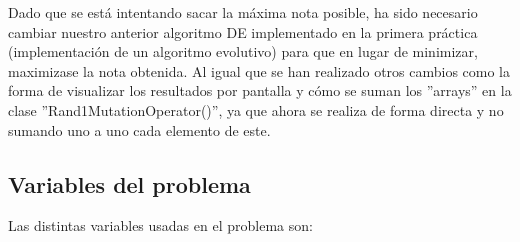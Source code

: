 \documentclass[11pt, a4paper, titlepage]{article}
\begin{document}
Dado que se está intentando sacar la máxima nota posible, ha sido necesario cambiar nuestro anterior algoritmo DE implementado en la primera práctica (implementación de un algoritmo evolutivo) para que en lugar de minimizar, maximizase la nota obtenida. Al igual que se han realizado otros cambios como la forma de visualizar los resultados por pantalla y cómo se suman los ''arrays'' en la clase ''Rand1MutationOperator()'', ya que ahora se realiza de forma directa y no sumando uno a uno cada elemento de este.

\subsection{Variables del problema}
Las distintas variables usadas en el problema son:

\vspace{5mm}
\end{document}
